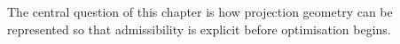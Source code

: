 The central question of this chapter is how projection geometry can be represented so that admissibility is explicit before optimisation begins.
